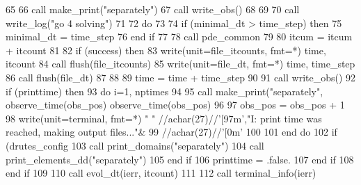 \begin{DoxyCode}
65 \textcolor{comment}{      }
66 \textcolor{comment}{     }\textcolor{keyword}{call }make_print(\textcolor{stringliteral}{"separately"})
67      \textcolor{keyword}{call }write_obs()
68      
69 
70      \textcolor{keyword}{call }write_log(\textcolor{stringliteral}{"go 4 solving"})
71       
72       \textcolor{keywordflow}{do}
73 
74         \textcolor{keywordflow}{if} (minimal_dt > time_step) \textcolor{keywordflow}{then}
75           minimal_dt = time_step
76 \textcolor{keywordflow}{        end if}
77 
78         \textcolor{keyword}{call }pde_common%
79         
80         itcum = itcum + itcount
81 
82         \textcolor{keywordflow}{if} (success) \textcolor{keywordflow}{then}
83           \textcolor{keyword}{write}(unit=file\_itcounts, fmt=*) time, itcount
84           \textcolor{keyword}{call }flush(file\_itcounts)
85           \textcolor{keyword}{write}(unit=file_dt, fmt=*) time, time_step
86           \textcolor{keyword}{call }flush(file_dt)
87           
88 
89           time = time + time_step
90 
91           \textcolor{keyword}{call }write_obs()
92           \textcolor{keywordflow}{if} (printtime) \textcolor{keywordflow}{then}
93             \textcolor{keywordflow}{do} i=1, nptimes
94                       
95               \textcolor{keyword}{call }make_print(\textcolor{stringliteral}{"separately"}, observe_time(obs\_pos)%
      observe_time\textcolor{comment}{(obs\_pos)%
96 \textcolor{comment}{              }
97 \textcolor{comment}{              obs\_pos = obs\_pos + 1}
98 \textcolor{comment}{              }\textcolor{keyword}{write}(unit=terminal, fmt=*)  \textcolor{stringliteral}{" "} //achar(27)//\textcolor{stringliteral}{'[97m'},\textcolor{stringliteral}{"I: print time was reached, making
       output files..."}\textcolor{comment}{&}
99 \textcolor{comment}{                                            //achar(27)//}\textcolor{stringliteral}{'[0m'}
100         
101 \textcolor{keywordflow}{            end do}
102             \textcolor{keywordflow}{if} (drutes_config%
103               \textcolor{keyword}{call }print_domains(\textcolor{stringliteral}{"separately"})
104               \textcolor{keyword}{call }print_elements_dd(\textcolor{stringliteral}{"separately"})
105 \textcolor{keywordflow}{            end if}
106             printtime = .false.
107 \textcolor{keywordflow}{          end if}
108 \textcolor{keywordflow}{        end if}
109 
110         \textcolor{keyword}{call }evol\_dt(ierr, itcount)
111 
112         \textcolor{keyword}{call }terminal\_info(ierr)
}
\end{DoxyCode}

